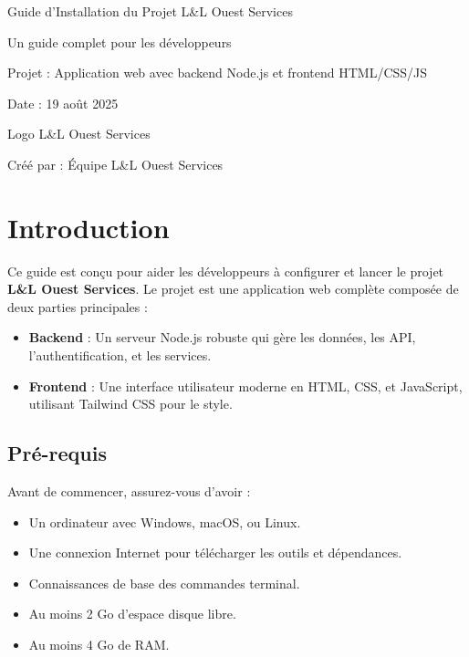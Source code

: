 \documentclass[12pt, a4paper]{article}
\begin{document}
\begin{titlepage}
  \centering
  \vspace*{2cm}
  {\Huge \color{titleblue} Guide d'Installation du Projet L\&L Ouest Services \par}
  \vspace{1cm}
  {\Large \color{black} Un guide complet pour les développeurs \par}
  \vspace{2cm}
  {\large \color{gray} Projet : Application web avec backend Node.js et frontend HTML/CSS/JS \par}
  \vspace{1cm}
  {\large \color{gray} Date : 19 août 2025 \par}
  \vspace{2cm}
  {\large \color{black} Logo L\&L Ouest Services \par} %
  \vspace{1cm}
  {\large \color{black} Créé par : Équipe L\&L Ouest Services \par}
\end{titlepage}

\tableofcontents
\newpage

\section{Introduction}
Ce guide est conçu pour aider les développeurs à configurer et lancer le projet \textbf{L\&L Ouest Services}. Le projet est une application web complète composée de deux parties principales :
\begin{itemize}
  \item \textbf{Backend} : Un serveur Node.js robuste qui gère les données, les API, l'authentification, et les services.
  \item \textbf{Frontend} : Une interface utilisateur moderne en HTML, CSS, et JavaScript, utilisant Tailwind CSS pour le style.
\end{itemize}

\subsection{Pré-requis}
Avant de commencer, assurez-vous d'avoir :
\begin{itemize}
  \item Un ordinateur avec Windows, macOS, ou Linux.
  \item Une connexion Internet pour télécharger les outils et dépendances.
  \item Connaissances de base des commandes terminal.
  \item Au moins 2 Go d'espace disque libre.
  \item Au moins 4 Go de RAM.
\end{itemize}
\end{document}
